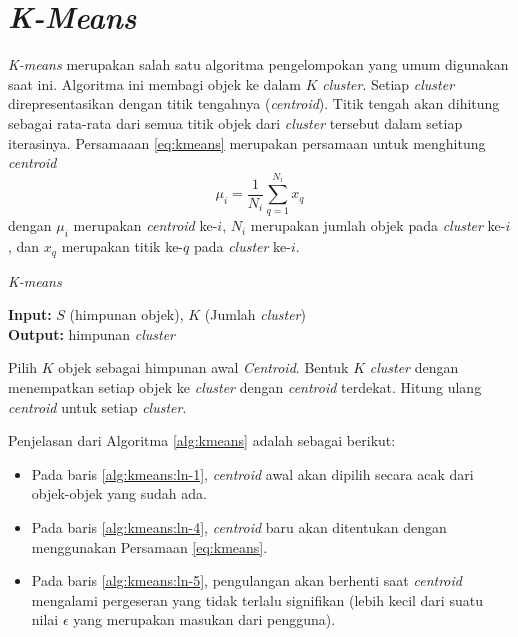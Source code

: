 \section{\textit{K-Means}}
\textit{K-means} merupakan salah satu algoritma pengelompokan yang umum digunakan saat ini. Algoritma ini membagi objek ke dalam $K$ \textit{cluster}. Setiap \textit{cluster} direpresentasikan dengan titik tengahnya (\textit{centroid}). Titik tengah akan dihitung sebagai rata-rata dari semua titik objek dari \textit{cluster} tersebut dalam setiap iterasinya. Persamaaan \ref{eq:kmeans} merupakan persamaan untuk menghitung \textit{centroid}
\begin{equation}
	\label{eq:kmeans}
	\mu_i=\frac{1}{N_i}\sum_{q=1}^{N_i}x_q
\end{equation}
dengan $\mu_i$ merupakan \textit{centroid} ke-$i$, $N_i$ merupakan jumlah objek pada \textit{cluster} ke-$i$, dan $x_q$ merupakan titik ke-$q$ pada \textit{cluster} ke-$i$.

\begin{algorithm} %
\caption{\textit{K-means}} %
\label{alg:kmeans} %
\begin{flushleft}
	\textbf{Input:} $S$ (himpunan objek), $K$ (Jumlah \textit{cluster})\\
	\textbf{Output:} himpunan \textit{cluster}
\end{flushleft}
\begin{algorithmic}[1] %
	\STATE Pilih $K$ objek sebagai himpunan awal \textit{Centroid}. \label{alg:kmeans:ln-1}
	\REPEAT \label{alg:kmeans:ln-2}
		\STATE Bentuk $K$ \textit{cluster} dengan menempatkan setiap objek ke \textit{cluster} dengan \textit{centroid} terdekat. \label{alg:kmeans:ln-3}
		\STATE Hitung ulang \textit{centroid} untuk setiap \textit{cluster}. \label{alg:kmeans:ln-4}
	 \label{alg:kmeans:ln-5}
\end{algorithmic}
\end{algorithm}

Penjelasan dari Algoritma \ref{alg:kmeans} adalah sebagai berikut:
\begin{itemize}
	\item Pada baris \ref{alg:kmeans:ln-1}, \textit{centroid} awal akan dipilih secara acak dari objek-objek yang sudah ada.
	\item Pada baris \ref{alg:kmeans:ln-4}, \textit{centroid} baru akan ditentukan dengan menggunakan Persamaan \ref{eq:kmeans}.
	\item Pada baris \ref{alg:kmeans:ln-5}, pengulangan akan berhenti saat \textit{centroid} mengalami pergeseran yang tidak terlalu signifikan (lebih kecil dari suatu nilai $\epsilon$ yang merupakan masukan dari pengguna).
\end{itemize}

